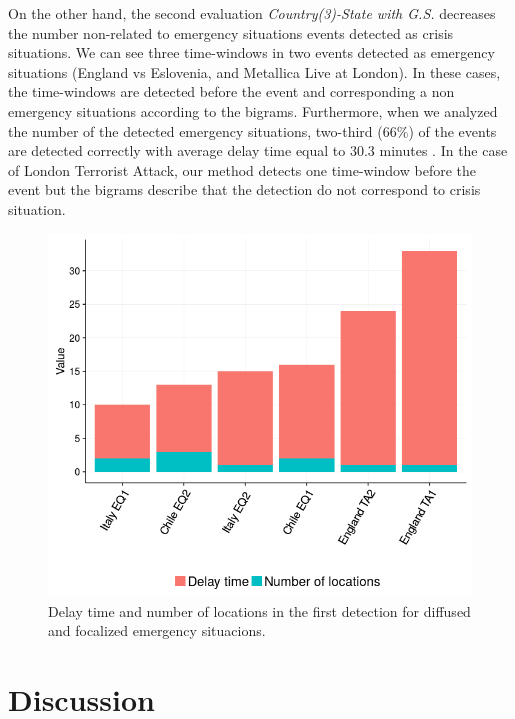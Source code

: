 \documentclass[sigconf]{acmart}
\begin{document}
On the other hand, the second evaluation \textit{Country(3)-State with G.S.} decreases the number non-related to emergency situations events detected as crisis situations. We can see three time-windows in two events detected as emergency situations (England vs Eslovenia, and Metallica Live at London). In these cases, the time-windows are detected before the event and corresponding a non emergency situations according to the bigrams. Furthermore, when we analyzed the number of the detected emergency situations, two-third ($66\%$) of the events are detected correctly with average delay time equal to $30.3$ minutes . In the case of London Terrorist Attack, our method detects one time-window before the event but the bigrams describe that the detection do not correspond to crisis situation.



\begin{figure}
	\centering
	\includegraphics[width=\columnwidth]{img/delay.png}
	\caption{Delay time and number of locations in the first detection for diffused and focalized emergency situacions.}
	\label{fig:delay}
\end{figure}

\section{Discussion}
\end{document}

